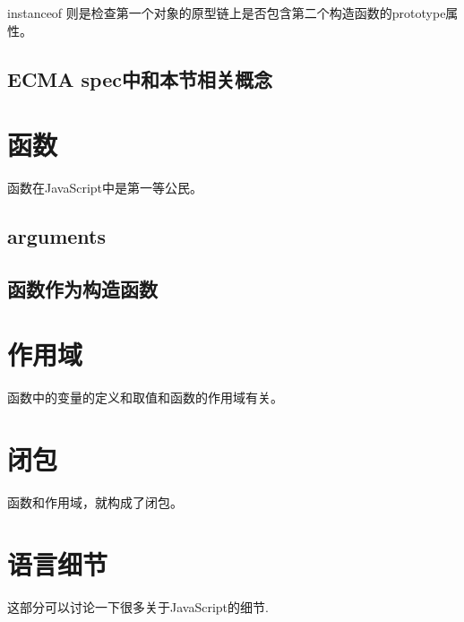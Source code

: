 	instanceof 则是检查第一个对象的原型链上是否包含第二个构造函数的prototype属性。

	
\subsection{ECMA spec中和本节相关概念}

\section{函数}
函数在JavaScript中是第一等公民。

	
\subsection{arguments}
\subsection{函数作为构造函数}	
	
\section{作用域}
	函数中的变量的定义和取值和函数的作用域有关。
\section{闭包}
	函数和作用域，就构成了闭包。
\section{语言细节}
	这部分可以讨论一下很多关于JavaScript的细节.
